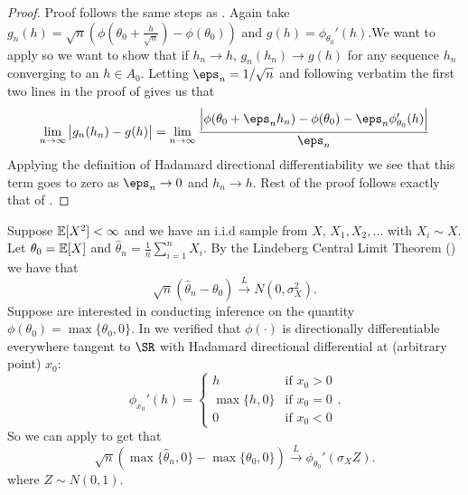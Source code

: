 \begin{proof}
	Proof follows the same steps as . Again take \(g_n(h) = \sqrt{n}\left(\phi(\theta_0 + \frac{h}{\sqrt{n}})-\phi(\theta_0)\right)\) and \(g(h) = \phi_{\theta_0}'(h)\).We want to apply  so we want to show that if \(h_n \to h \), \(g_n(h_n)\to g(h)\) for any sequence \(h_n\) converging to an \(h \in A_0\). Letting \(\eps_n=1/\sqrt{n}\) and following verbatim the first two lines in the proof of  gives us that
	\begin{align*}
	\lim_{n\to\infty}\left|g_n(h_n)-g(h)\right| = \lim_{n\to \infty}\frac{\left|\phi(\theta_0+\eps_nh_n)-\phi(\theta_0)-\eps_n\phi_{\theta_0}'(h)\right|}{\eps_n} 
	\end{align*}
	Applying the definition of Hadamard directional differentiability we see that this term goes to zero as \(\eps_n\to 0\) and \(h_n\to h\). Rest of the proof follows exactly that of .
\end{proof}
\begin{example}
	Suppose \(\mathbb{E}[X^2] < \infty\) and we have an i.i.d sample from \(X\), \(X_1,X_2,\dots\) with \(X_i\sim X\). Let \(\theta_0 = \mathbb{E}[X]\) and \(\hat \theta_n = \frac{1}{n}\sum_{i=1}^n X_i\). By the Lindeberg Central Limit Theorem () we have that
	\[
		\sqrt{n}\left(\hat\theta_n-\theta_0\right)\overset{L}{\to} N(0,\sigma_X^2)
	.\] 
	Suppose are interested in conducting inference on the quantity \(\phi(\theta_0) = \max\{\theta_0,0\}\). In  we verified that \(\phi(\cdot)\) is directionally differentiable everywhere tangent to \(\SR\) with Hadamard directional differential at (arbitrary point) \(x_0\):
	\[
		\phi_{x_0}'(h) = \begin{cases}
			h & \text{if }x_0 > 0 \\
			\max\{h,0\} & \text{if }x_0=0\\
			0 &\text{if }x_0 < 0
		\end{cases}
	.\] 
	So we can apply  to get that
	\[
		\sqrt{n}\left(\max\{\hat\theta_n,0\} - \max\{\theta_0,0\}  \right)\overset{L}{\to} \phi_{\theta_0}'\left(\sigma_X Z\right)
	.\] 
	where \(Z\sim N(0,1)\).
\end{example}


